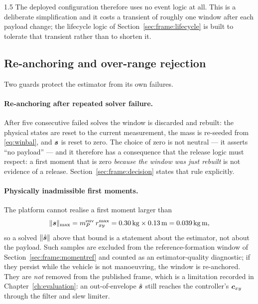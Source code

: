\begin{spacing}{1.5}
The deployed configuration therefore uses no event logic at all. This is a
deliberate simplification and it costs a transient of roughly one window after
each payload change; the lifecycle logic of Section~\ref{sec:frame:lifecycle} is
built to tolerate that transient rather than to shorten it.

\subsection{Re-anchoring and over-range rejection}\label{sec:frame:reanchor}

Two guards protect the estimator from its own failures.

\paragraph{Re-anchoring after repeated solver failure.} After five consecutive
failed solves the window is discarded and rebuilt: the physical states are reset
to the current measurement, the mass is re-seeded from \eqref{eq:winbal}, and
$\bm{s}$ is reset to zero. The choice of zero is not neutral --- it asserts ``no
payload'' --- and it therefore has a consequence that the release logic must
respect: a first moment that is zero \emph{because the window was just rebuilt}
is not evidence of a release. Section~\ref{sec:frame:decision} states that rule
explicitly.

\paragraph{Physically inadmissible first moments.} The platform cannot realise a
first moment larger than
\begin{equation}
\lVert\svec\rVert_{\max} = \mP^{\mathrm{env}}\, r_{xy}^{\max}
= \SI{0.30}{\kg}\times\SI{0.13}{\meter} = \SI{0.039}{\kg\meter},
\label{eq:sadmissible}
\end{equation}
so a solved $\lVert\hat{\bm{s}}\rVert$ above that bound is a statement about the
estimator, not about the payload. Such samples are excluded from the
reference-formation window of Section~\ref{sec:frame:momentref} and counted as an
estimator-quality diagnostic; if they persist while the vehicle is not
manoeuvring, the window is re-anchored. They are \emph{not} removed from the
published frame, which is a limitation recorded in Chapter~\ref{ch:evaluation}:
an out-of-envelope $\hat{\bm{s}}$ still reaches the controller's $\bm{c}_{xy}$ through the
filter and slew limiter.


\end{spacing}
